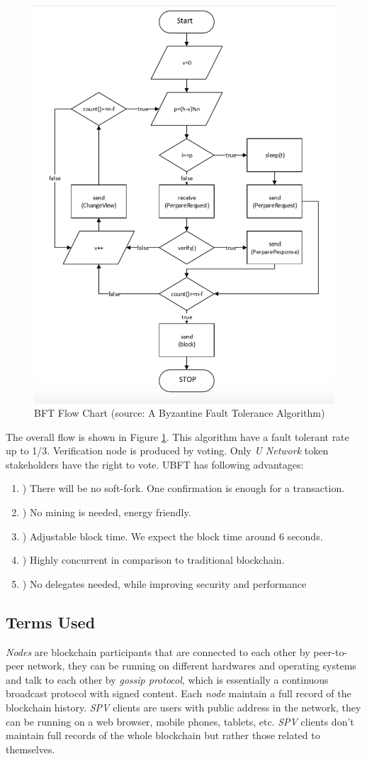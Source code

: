 \begin{figure}
\centering
\includegraphics[width= 0.7 \linewidth]{consensus.png}
\caption{BFT Flow Chart (source: A Byzantine Fault Tolerance Algorithm\cite{neo})}
\label{fig:ubft}
\end{figure}    
    
    The overall flow is shown in Figure \ref{fig:ubft}. This algorithm have a fault tolerant rate up to 1/3. Verification node is produced by voting. Only \emph{U Network} token stakeholders have the right to vote.  UBFT has following advantages:
\begin{enumerate}
    \item ) There will be no soft-fork. One confirmation is enough for a transaction. 
    \item ) No mining is needed, energy friendly.
    \item ) Adjustable block time. We expect the block time around 6 seconds. 
    \item ) Highly concurrent in comparison to traditional blockchain. 
    \item ) No delegates needed, while improving security and performance
\end{enumerate}



\subsection{Terms Used}
    \textit{Nodes} are blockchain participants that are connected to each other by peer-to-peer network, they can be running on different hardwares and operating systems and talk to each other by \textit{gossip protocol}, which is essentially a continuous broadcast protocol with signed content. Each \textit{node} maintain a full record of the blockchain history. \textit{SPV} clients are users with public address in the network, they can be running on a web browser, mobile phones, tablets, etc. \textit{SPV} clients don't maintain full records of the whole blockchain but rather those related to themselves.

